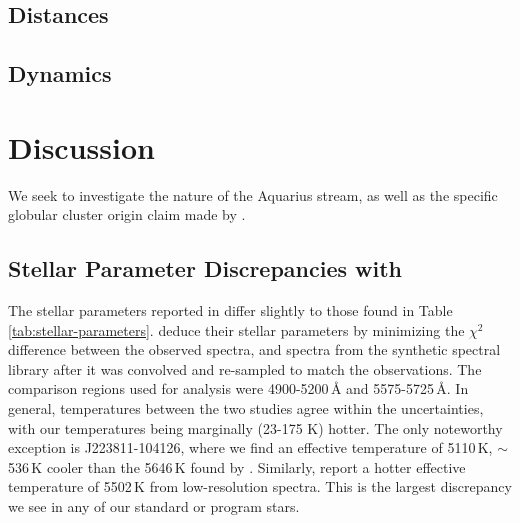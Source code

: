 \documentclass{emulateapj}
\begin{document}


\subsection{Distances}



\subsection{Dynamics}




\section{Discussion}


We seek to investigate the nature of the Aquarius stream, as well as the specific globular cluster origin claim made by \citet{wylie-de-boer;et-al_2012}. 

\subsection{Stellar Parameter Discrepancies with \citet{wylie-de-boer;et-al_2012}}

The stellar parameters reported in \citet{wylie-de-boer;et-al_2012} differ slightly to those found in Table \ref{tab:stellar-parameters}. \citet{wylie-de-boer;et-al_2012} deduce their stellar parameters by minimizing the $\chi^2$ difference between the observed spectra, and spectra from the \citet{munari;et-al_2005} synthetic spectral library after it was convolved and re-sampled to match the observations. The comparison regions used for analysis were 4900-5200\,{\AA} and 5575-5725\,{\AA}. In general, temperatures between the two studies agree within the uncertainties, with our temperatures being marginally (23-175 K) hotter. The only noteworthy exception is J223811-104126, where we find an effective temperature of 5110\,K, ${\sim}$536\,K cooler than the 5646\,K found by \citet{wylie-de-boer;et-al_2012}.  Similarly, \citet{williams;et-al_2011} report a hotter effective temperature of 5502\,K from low-resolution spectra. This is the largest discrepancy we see in any of our standard or program stars.
\end{document}
